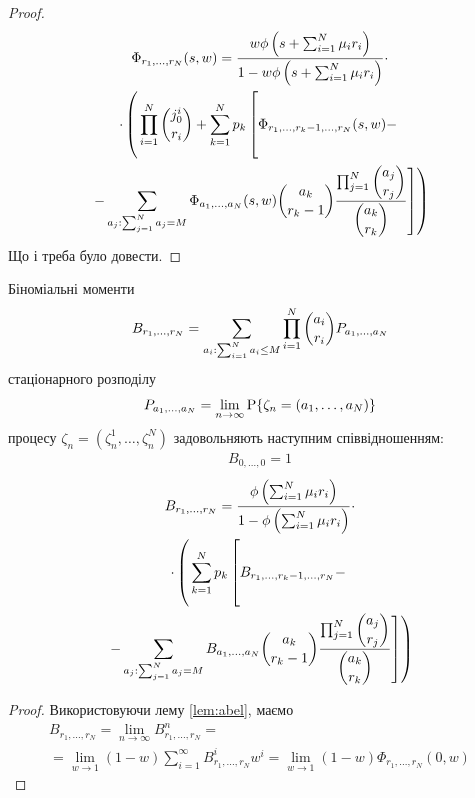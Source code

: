 \documentclass{KnuBulletin}
\begin{document}
\begin{multicols}{2}
\begin{proof}
        \begin{multline*}
        \Phi_{r_1,...,r_N}(s,w)
        =
        \frac
        {w \phi\left(s+\sum_{i=1}^N \mu_i r_i\right)}
        {1- w \phi\left(s+\sum_{i=1}^N \mu_i r_i\right)}
        \cdot
        \\
        \cdot
        \left(\vphantom{\sum_\sum}
        \prod_{i=1}^N \dbinom{j_{0}^i}{r_i}
        +
        \sum_{k=1}^N p_k
        \left[\vphantom{\sum_\sum}
        \Phi_{r_1,\dots,r_{k}-1,\dots,r_N}(s,w)
        -
        \right.\right.\\\left.\left.
        -
        \sum_{a_j: \sum_{j=1}^N a_j = M}
        \Phi_{a_1,...,a_N}(s,w)
        \dbinom{a_k}{r_k-1}
        \frac{\prod_{j=1}^N \dbinom{a_j}{r_j}} {\dbinom{a_k}{r_k}}
        \right]
        \right)
        \end{multline*}
        Що і треба було довести.
\end{proof}





\begin{theorem}
    \label{thm:lim-bin-mom-recurrent}
    Біноміальні моменти
   	\begin{gather*}
        B_{r_1,\dots,r_N}
        = \sum_{a_i: \sum_{i=1}^N a_i \le M}
        \prod_{i=1}^N \dbinom{a_i}{r_i}
        P_{a_1,\dots,a_N}
    \end{gather*}
    стаціонарного розподілу
    \begin{gather*}
    P_{a_1,\dots,a_N} 
    = \lim_{n\rightarrow\infty} {{\rm P}{\left\{\zeta_n=(a_1,\dots,a_N)\right\}}}
    \end{gather*}
    процесу $\zeta_n=(\zeta_n^1,\dots,\zeta_n^N)$
    задовольняють наступним співвідношенням:
	\begin{gather*}
    B_{0,\dots,0}=1
    \end{gather*}
    \begin{multline*}
        B_{r_1,\dots,r_N}=
        \frac
        { \phi\left(\sum_{i=1}^N \mu_i r_i\right)}
        {1- \phi\left(\sum_{i=1}^N \mu_i r_i\right)}
        \cdot\\\cdot
        \left(\vphantom{\sum_\sum}
        \sum_{k=1}^N p_k
        \left[\vphantom{\sum_\sum}
        B_{r_1,\dots,r_{k}-1,\dots,r_N}
        -
        \right.\right.\\\left.\left.
        -
        \sum_{a_j: \sum_{j=1}^N a_j = M}
        B_{a_1,...,a_N}
        \dbinom{a_k}{r_k-1}
        \frac{\prod_{j=1}^N \dbinom{a_j}{r_j}} {\dbinom{a_k}{r_k}}
        \right]
        \right)
    \end{multline*}    
\end{theorem}
\begin{proof}
    Використовуючи лему \ref{lem:abel}, маємо
    \begin{multline*}
    B_{r_1,...,r_N}
    =\lim_{n\rightarrow\infty} B_{r_1,...,r_N}^{n}
    =\\=
    \lim_{w\rightarrow 1} (1-w)\sum_{i=1}^\infty B_{r_1,...,r_N}^{i}w^i 
    =\lim_{w\rightarrow 1} (1-w)\Phi_{r_1,...,r_N}(0,w)
    \end{multline*}
        

\end{proof}
\end{multicols}
\end{document}
